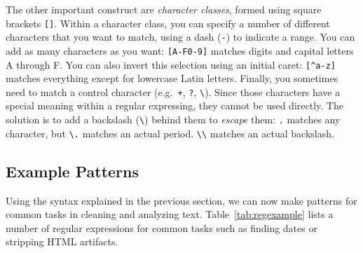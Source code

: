 The other important construct are \emph{character classes}, formed using square brackets \verb|[]|.
Within a character class, you can specify a number of different characters that you want to match, using a dash (\verb|-|) to indicate a range.
You can add as many characters as you want: \verb|[A-F0-9]| matches digits and capital letters A through F.
You can also invert this selection using an initial caret: \verb|[^a-z]| matches everything except for lowercase Latin letters.
Finally, you sometimes need to match a control character  (e.g.\ \verb|+|, \verb|?|, \verb|\|). Since those characters have a special meaning within a regular expressing, they cannot be used directly. The solution is to add a backslash (\verb|\|) behind them to \emph{escape} them:
\verb|.| matches any character, but \verb|\.| matches an actual period. \verb|\\| matches an actual backslash.

\subsection{Example Patterns}\label{sec:regexamples}

Using the syntax explained in the previous section, we can now make patterns for common tasks in cleaning and analyzing text.
Table~\ref{tab:regexample} lists a number of regular expressions for common tasks such as finding dates or stripping HTML artifacts.

%


